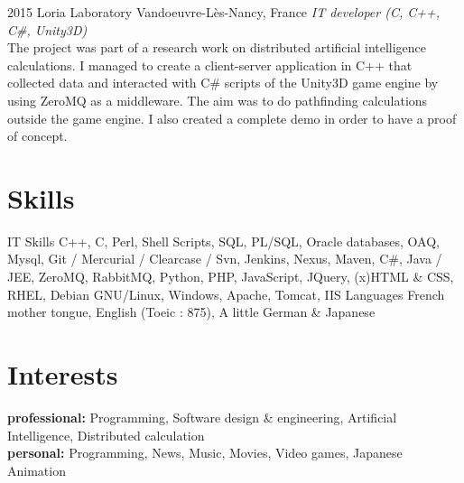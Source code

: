 \documentclass[]{friggeri-cv} %
\begin{document}
\begin{entrylist}

\entry
{2015}
{Loria Laboratory}
{Vandoeuvre-Lès-Nancy, France}
{ \emph {IT developer (C, C++, C\#, Unity3D)}\\
The project was part of a research work on distributed artificial intelligence calculations. I managed to create a client-server application in C++ that collected data and interacted with C\# scripts of the Unity3D game engine by using ZeroMQ as a middleware. The aim was to do pathfinding calculations outside the game engine. I also created a complete demo in order to have a proof of concept. }


\end{entrylist}


\section{Skills}
\begin{entrylist}
\entry
{ }
{IT Skills}
{ }
{ C++, C, Perl, Shell Scripts, SQL, PL/SQL, Oracle databases, OAQ, Mysql, Git / Mercurial / Clearcase / Svn, Jenkins, Nexus, Maven, C\#, Java / JEE,  ZeroMQ, RabbitMQ, Python, PHP, JavaScript, JQuery, (x)HTML \& CSS, RHEL, Debian GNU/Linux, Windows, Apache, Tomcat, IIS }
\entry
{ }
{Languages}
{ }
{French mother tongue, English (Toeic : 875), A little German \& Japanese}
\end{entrylist}
\section{Interests}

\textbf{professional:} Programming, Software design \& engineering, Artificial Intelligence, Distributed calculation \\
\textbf{personal:} Programming, News, Music, Movies, Video games, Japanese Animation


\end{document}
